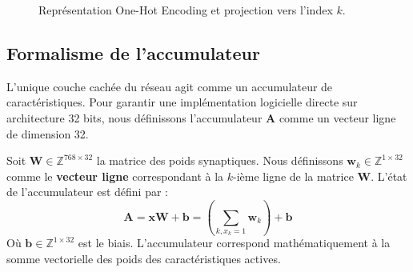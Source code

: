 \documentclass[11pt, a4paper]{article}
\begin{document}
\begin{figure}[H]
    \centering
    \caption{Représentation One-Hot Encoding et projection vers l'index $k$.}
\end{figure}

\subsection{Formalisme de l'accumulateur}
L'unique couche cachée du réseau agit comme un accumulateur de caractéristiques. Pour garantir une implémentation logicielle directe sur architecture 32 bits, nous définissons l'accumulateur $\mathbf{A}$ comme un vecteur ligne de dimension 32. 

Soit $\mathbf{W} \in \mathbb{Z}^{768 \times 32}$ la matrice des poids synaptiques. Nous définissons $\mathbf{w}_k \in \mathbb{Z}^{1 \times 32}$ comme le \textbf{vecteur ligne} correspondant à la $k$-ième ligne de la matrice $\mathbf{W}$. L'état de l'accumulateur est défini par :
\begin{equation}
    \mathbf{A} = \mathbf{xW} + \mathbf{b} = \left( \sum_{k, x_k=1} \mathbf{w}_k \right) + \mathbf{b}
\end{equation}
Où $\mathbf{b} \in \mathbb{Z}^{1 \times 32}$ est le biais. L'accumulateur correspond mathématiquement à la somme vectorielle des poids des caractéristiques actives.
\end{document}

